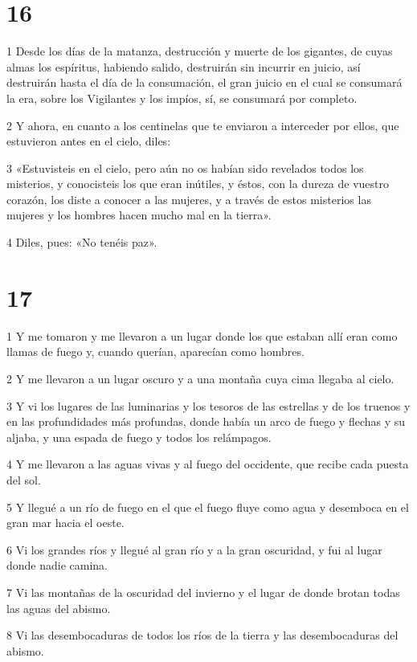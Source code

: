 \chapter{16}

\par 1 Desde los días de la matanza, destrucción y muerte de los gigantes, de cuyas almas los espíritus, habiendo salido, destruirán sin incurrir en juicio, así destruirán hasta el día de la consumación, el gran juicio en el cual se consumará la era, sobre los Vigilantes y los impíos, sí, se consumará por completo.
\par 2 Y ahora, en cuanto a los centinelas que te enviaron a interceder por ellos, que estuvieron antes en el cielo, diles:
\par 3 «Estuvisteis en el cielo, pero aún no os habían sido revelados todos los misterios, y conocisteis los que eran inútiles, y éstos, con la dureza de vuestro corazón, los diste a conocer a las mujeres, y a través de estos misterios las mujeres y los hombres hacen mucho mal en la tierra».
\par 4 Diles, pues: «No tenéis paz».

\chapter{17}

\par 1 Y me tomaron y me llevaron a un lugar donde los que estaban allí eran como llamas de fuego y, cuando querían, aparecían como hombres.
\par 2 Y me llevaron a un lugar oscuro y a una montaña cuya cima llegaba al cielo.
\par 3 Y vi los lugares de las luminarias y los tesoros de las estrellas y de los truenos y en las profundidades más profundas, donde había un arco de fuego y flechas y su aljaba, y una espada de fuego y todos los relámpagos.
\par 4 Y me llevaron a las aguas vivas y al fuego del occidente, que recibe cada puesta del sol.
\par 5 Y llegué a un río de fuego en el que el fuego fluye como agua y desemboca en el gran mar hacia el oeste.
\par 6 Vi los grandes ríos y llegué al gran río y a la gran oscuridad, y fui al lugar donde nadie camina.
\par 7 Vi las montañas de la oscuridad del invierno y el lugar de donde brotan todas las aguas del abismo.
\par 8 Vi las desembocaduras de todos los ríos de la tierra y las desembocaduras del abismo.

